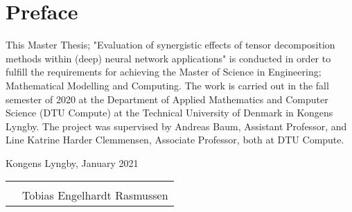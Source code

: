 \section{Preface}

\noindent This Master Thesis; "Evaluation of synergistic effects of tensor decomposition methods within (deep) neural network applications" is conducted in order to fulfill the requirements for achieving the Master of Science in Engineering; Mathematical Modelling and Computing. The work is carried out in the fall semester of 2020 at the Department of Applied Mathematics and Computer Science (DTU Compute) at the Technical University of Denmark in Kongens Lyngby. The project was supervised by Andreas Baum, Assistant Professor, and Line Katrine Harder Clemmensen, Associate Professor, both at DTU Compute.

\vspace{4cm}
\begin{flushright}
Kongens Lyngby, January 2021 \\
\vspace{2cm}

\begin{tabular}{ll}
         &                   \\ \hline
         &                    \\
 & Tobias Engelhardt Rasmussen
\end{tabular}

\end{flushright}
